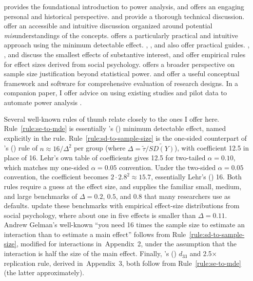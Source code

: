 \documentclass[12pt]{article}
\begin{document}
\citet{Cohen1988} provides the foundational introduction to power analysis, and \citet{Cohen1990} offers an engaging personal and historical perspective.
\citet[ch.~9]{DeGroot2010} and \citet[ch.~8]{Casella2002} provide a thorough technical discussion.
\citet{Greenland2016} offer an accessible and intuitive discussion organized around potential \textit{mis}understandings of the concepts.
\citet{Bloom1995} offers a particularly practical and intuitive approach using the minimum detectable effect.
\citet{Cohen1992}, \citet{Lenth2001}, and \citet{Meyvis2017} also offer practical guides.
\citet{Rainey2014}, \citet{McCaskey2015}, and \citet[see esp.~261--263]{Lakens2018} discuss the smallest effects of substantive interest, and \citet{Lovakov2021} offer empirical rules for effect sizes derived from social psychology.
\citet{Lakens2022} offers a broader perspective on sample size justification beyond statistical power.
\citet{Blair2019} and \citet{Blair2023} offer a useful conceptual framework and software for comprehensive evaluation of research designs.
In a companion paper, I offer advice on using existing studies and pilot data to automate power analysis \citep{Rainey2024pilot}.

Several well-known rules of thumb relate closely to the ones I offer here.
Rule~\ref{rule:se-to-mde} is essentially \citeauthor{Bloom1995}'s (\citeyear{Bloom1995}) minimum detectable effect, named explicitly in the rule.
Rule~\ref{rule:sd-to-sample-size} is the one-sided counterpart of \citeauthor{Lehr1992}'s (\citeyear{Lehr1992}) rule of $n \approx 16/\Delta^2$ per group (where $\Delta = \widetilde{\tau}/\widetilde{SD(Y)}$), with coefficient 12.5 in place of 16.
Lehr's own table of coefficients gives 12.5 for two-tailed $\alpha = 0.10$, which matches my one-sided $\alpha = 0.05$ convention.
Under the two-sided $\alpha = 0.05$ convention, the coefficient becomes $2 \cdot {2.8}^{2} \approx 15.7$, essentially Lehr's (\citeyear{Lehr1992}) 16.
Both rules require a guess at the effect size, and \citet[25--26]{Cohen1988} supplies the familiar small, medium, and large benchmarks of $\Delta = 0.2$, $0.5$, and $0.8$ that many researchers use as defaults.
\citet{Lovakov2021} update these benchmarks with empirical effect-size distributions from social psychology, where about one in five effects is smaller than $\Delta = 0.11$.
Andrew Gelman's well-known ``you need 16 times the sample size to estimate an interaction than to estimate a main effect'' follows from Rule~\ref{rule:sd-to-sample-size}, modified for interactions in~Appendix~2, under the assumption that the interaction is half the size of the main effect.
Finally, \citeauthor{Simonsohn2015}'s (\citeyear{Simonsohn2015}) $d_{33}$ and 2.5$\times$ replication rule, derived in~Appendix~3, both follow from Rule~\ref{rule:se-to-mde} (the latter approximately).
\end{document}
